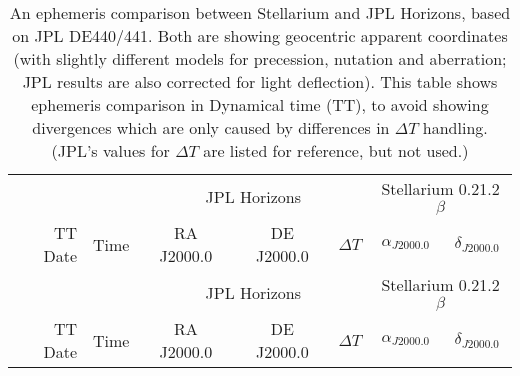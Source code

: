 
\begin{longtable}{r@{\,}r|r@{h}r@{m}r<{s}|r@{°}r@{'}r<{''}|r<{s}||r@{h}r@{m}r<{s}|r@{°}r@{'}r<{''}}

\caption{An ephemeris comparison between Stellarium and JPL Horizons, based on JPL DE440/441. 
Both are showing geocentric apparent coordinates (with slightly 
different models for precession, nutation and aberration; JPL results are also 
corrected for light deflection). This table shows ephemeris comparison in Dynamical time (TT), to avoid showing divergences which are only caused by differences in $\Delta T$ handling. 
(JPL's values for $\Delta T$ are listed for reference, but not used.)}
\label{tab:accuracy:TT}\\
\multicolumn{2}{c}{}&\multicolumn{7}{c||}{JPL Horizons} & \multicolumn{6}{c}{Stellarium 0.21.2$\beta$}\\ 
TT Date   & Time & \multicolumn{3}{c}{RA J2000.0} & \multicolumn{3}{c}{DE J2000.0} & \multicolumn{1}{c||}{$\Delta T$}& \multicolumn{3}{c}{$\alpha_{J2000.0}$} & \multicolumn{3}{c}{$\delta_{J2000.0}$} \\
\midrule\endfirsthead

\multicolumn{2}{c}{}&\multicolumn{7}{c||}{JPL Horizons} & \multicolumn{6}{c}{Stellarium 0.21.2$\beta$}\\ 
TT Date   & Time & \multicolumn{3}{c}{RA J2000.0} & \multicolumn{3}{c}{DE J2000.0} & \multicolumn{1}{c||}{$\Delta T$}& \multicolumn{3}{c}{$\alpha_{J2000.0}$} & \multicolumn{3}{c}{$\delta_{J2000.0}$}  \\
\midrule\endhead
  

\end{longtable}
